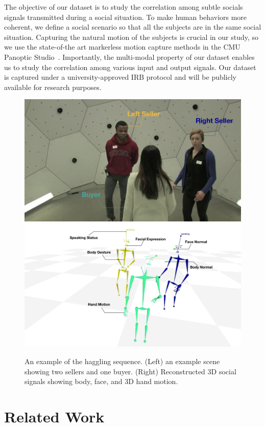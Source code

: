 The objective of our dataset is to study the correlation among subtle socials signals transmitted during a social situation. To make human behaviors more coherent, we define a social scenario so that all the subjects are in the same social situation. Capturing the natural motion of the subjects is crucial in our study, so we use the state-of-the art markerless motion capture methods in the CMU Panoptic Studio~\cite{joo2017panoptic, joo2018}. Importantly, the multi-modal property of our dataset enables us to study the correlation among various input and output signals. Our dataset is captured under a university-approved IRB protocol and will be publicly available for research purposes.

\begin{figure}
	\centering
	\includegraphics[trim=300 0 0 0,clip,width=0.49\linewidth]{ssp_fig/haggling_ex_input}
	\includegraphics[trim=300 0 0 0,clip,width=0.49\linewidth]{ssp_fig/haggling_ex_measure}
	\caption{An example of the haggling sequence. (Left) an example scene showing two sellers and one buyer. (Right) Reconstructed 3D social signals showing body, face, and 3D hand motion.} 
	\label{fig:haggling_example}
\end{figure}

\section{Related Work}

